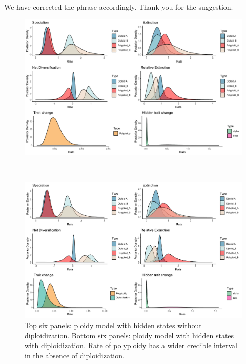 \documentclass[11pt]{article}
\begin{document}
We have corrected the phrase accordingly.
Thank you for the suggestion.
\begin{figure}
    \centering 
      \begin{minipage}[b]{0.5\textwidth}
    \includegraphics[width=\textwidth]{hisseDPnodipasymposteriordist.pdf} 
    \end{minipage}\\
    \vspace{1cm}
    \begin{minipage}[b]{0.5\textwidth}
        \includegraphics[width=\textwidth]{hisseDPasymposteriordist.pdf}
        \end{minipage}
    \caption{Top six panels: ploidy model with hidden states without diploidization. Bottom six panels: ploidy model with hidden states with diploidization. Rate of polyploidy has a wider credible interval in the absence of diploidization.}
    \label{figure:hissedip}
\end{figure}
\end{document}
